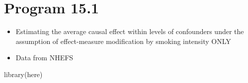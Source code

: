 \documentclass[
  10pt,
  a4paper,
]{book}
\newenvironment{Shaded}{\begin{snugshade}}{\end{snugshade}}
\newcommand{\FunctionTok}[1]{\textcolor[rgb]{0.28,0.35,0.67}{#1}}
\newcommand{\NormalTok}[1]{\textcolor[rgb]{0.00,0.46,0.62}{#1}}
\providecommand{\tightlist}{%
  \setlength{\itemsep}{0pt}\setlength{\parskip}{0pt}}
\begin{document}
\section{Program 15.1}\label{program-15.1}

\begin{itemize}
\tightlist
\item
  Estimating the average causal effect within levels of confounders under the assumption of effect-measure modification by smoking intensity ONLY
\item
  Data from NHEFS
\end{itemize}

\begin{Shaded}
\begin{Highlighting}[]
\FunctionTok{library}\NormalTok{(here)}
\end{Highlighting}
\end{Shaded}
\end{document}
